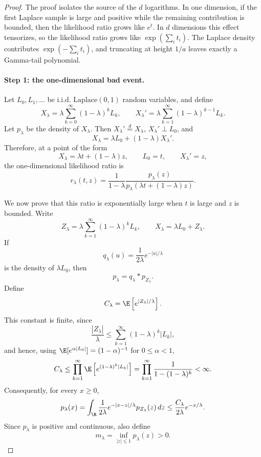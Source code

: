 \begin{proof}
    The proof isolates the source of the $d$ logarithms.  In one dimension,
    if the first Laplace sample is large and positive while the remaining
    contribution is bounded, then the likelihood ratio grows like $e^t$.
    In $d$ dimensions this effect tensorizes, so the likelihood ratio grows
    like $\exp(\sum_i t_i)$.  The Laplace density contributes
    $\exp(-\sum_i t_i)$, and truncating at height $1/a$ leaves exactly a
    Gamma-tail polynomial.

    \paragraph{Step 1: the one-dimensional bad event.}
    Let $L_0,L_1,\ldots$ be i.i.d. $\mathrm{Laplace}(0,1)$ random variables, and define
    \[
        X_\lambda
        =
        \lambda\sum_{k=0}^{\infty}(1-\lambda)^kL_k,
        \qquad
        X_\lambda'
        =
        \lambda\sum_{k=1}^{\infty}(1-\lambda)^{k-1}L_k .
    \]
    Let $p_\lambda$ be the density of $X_\lambda$. Then
    $X_\lambda'\stackrel{d}{=}X_\lambda$, $X_\lambda'\perp L_0$, and
    \[
        X_\lambda=\lambda L_0+(1-\lambda)X_\lambda'.
    \]
    Therefore, at a point of the form
    \[
        X_\lambda=\lambda t+(1-\lambda)z,
        \qquad
        L_0=t,
        \qquad
        X_\lambda'=z,
    \]
    the one-dimensional likelihood ratio is
    \[
        r_\lambda(t,z)
        =
        \frac{1}{1-\lambda}
        \frac{p_\lambda(z)}
        {p_\lambda(\lambda t+(1-\lambda)z)}.
        \label{eq:product_laplace_one_dim_ratio}
    \]

    We now prove that this ratio is exponentially large when $t$ is large
    and $z$ is bounded.  Write
    \[
        Z_\lambda
        =
        \lambda\sum_{k=1}^{\infty}(1-\lambda)^kL_k,
        \qquad
        X_\lambda=\lambda L_0+Z_\lambda.
    \]
    If
    \[
        q_\lambda(u)=\frac{1}{2\lambda}e^{-|u|/\lambda}
    \]
    is the density of $\lambda L_0$, then
    \[
        p_\lambda=q_\lambda*p_{Z_\lambda}.
    \]
    Define
    \[
        C_\lambda
        =
        \E\left[e^{|Z_\lambda|/\lambda}\right].
    \]
    This constant is finite, since
    \[
        \frac{|Z_\lambda|}{\lambda}
        \le
        \sum_{k=1}^{\infty}(1-\lambda)^k|L_k|,
    \]
    and hence, using $\E[e^{\alpha |L_0|}]=(1-\alpha)^{-1}$ for
    $0\le\alpha<1$,
    \[
        C_\lambda
        \le
        \prod_{k=1}^{\infty}
        \E\left[e^{(1-\lambda)^k|L_k|}\right]
        =
        \prod_{k=1}^{\infty}
        \frac{1}{1-(1-\lambda)^k}
        <\infty.
    \]
    Consequently, for every $x\ge0$,
    \[
        p_\lambda(x)
        =
        \int_\R
        \frac{1}{2\lambda}e^{-|x-z|/\lambda}
        p_{Z_\lambda}(z)\,dz
        \le
        \frac{C_\lambda}{2\lambda}e^{-x/\lambda}.
        \label{eq:product_laplace_density_tail}
    \]
    Since $p_\lambda$ is positive and continuous, also define
    \[
        m_\lambda
        =
        \inf_{|z|\le1}p_\lambda(z)
        >
        0.
    \]


\end{proof}
